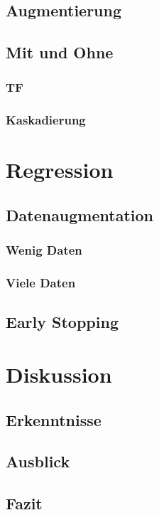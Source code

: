 \documentclass[ngerman]{report}
\begin{document}
    \section{Augmentierung}
    \section{Mit und Ohne}
    \subsection{TF}
    \subsection{Kaskadierung}


    \chapter{Regression}  %
    \section{Datenaugmentation}
    \subsection{Wenig Daten}
    \subsection{Viele Daten}
    \section{Early Stopping}
    
    \chapter{Diskussion}  %
    \section{Erkenntnisse}
    
    \section{Ausblick}
    \section{Fazit}

    \printbibliography
\end{document}
